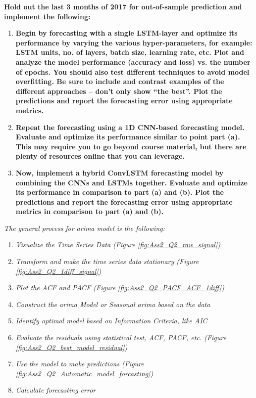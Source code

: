 \item \textbf{Hold out the last 3 months of 2017 for out-of-sample prediction and implement the following:} 
\begin{enumerate}
\item \textbf{Begin by forecasting with a single LSTM-layer and optimize its performance by varying the various hyper-parameters, for example: LSTM units, no. of layers, batch  size, learning  rate, etc. Plot and analyze the model performance (accuracy and loss) vs. the number of epochs. You should also test different  techniques to avoid model overfitting. Be sure to include and  contrast examples of the different approaches – don’t only show “the best”. Plot the predictions and report the forecasting error using appropriate metrics.}
\item \textbf{Repeat the forecasting using a 1D CNN-based  forecasting model. Evaluate and optimize its performance similar to point part (a). This may require you to go beyond course material, but there are plenty of resources online that you can leverage.}
\item \textbf{Now, implement a hybrid ConvLSTM forecasting model by combining the CNNs and LSTMs together. Evaluate and optimize its performance in comparison to part (a) and (b). Plot the predictions and report the forecasting error using appropriate metrics in comparison to part (a) and (b).}
\end{enumerate}






\textit{ The general process for \gls{arima} model is the following:}
\begin{enumerate}
\item \textit{Visualize the Time Series Data (Figure
        \ref{fig:Ass2_Q2_raw_signal})}
\item \textit{Transform and make the time series data stationary (Figure
        \ref{fig:Ass2_Q2_1diff_signal})}
\item \textit{Plot the \gls{ACF} and \gls{PACF} (Figure
        \ref{fig:Ass2_Q2_PACF_ACF_1diff})}
\item \textit{Construct the \gls{arima} Model or Seasonal \gls{arima} based on the data }
\item \textit{Identify optimal model based on Information Criteria, like \gls{AIC} }
\item \textit{Evaluate the residuals using statistical test, \gls{ACF}, \gls{PACF}, etc. (Figure
         \ref{fig:Ass2_Q2_best_model_residual})}
\item \textit{Use the model to make predictions (Figure
        \ref{fig:Ass2_Q2_Automatic_model_forcasting})}
\item \textit{Calculate forecasting error}


\end{enumerate}


